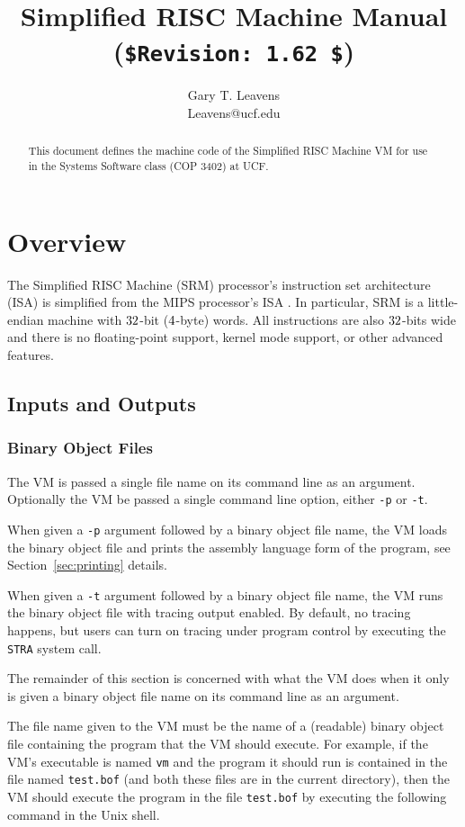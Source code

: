\documentclass[11pt,letterpaper]{article}
\title{Simplified RISC Machine Manual \\
       (\lstinline!$Revision: 1.62 $!)}
\author{Gary T. Leavens \\
        Leavens@ucf.edu}
\newcommand{\secref}[1]{Section~\ref{#1}}  %
\begin{document}
\maketitle
\begin{abstract}
This document defines the machine code of the Simplified RISC Machine VM for
use in the Systems Software class (COP 3402) at UCF.
\end{abstract}

\section{Overview}

The Simplified RISC Machine (SRM) processor's instruction set architecture
(ISA) is simplified from the MIPS processor's ISA \cite{Kane-Heinrich92}. 
In particular, SRM is a little-endian machine with $32$-bit ($4$-byte) words.
All instructions are also $32$-bits wide and there is no floating-point support, kernel mode support, or other advanced features.

\subsection{Inputs and Outputs}

\subsubsection{Binary Object Files}

The VM is passed a single file name on its command line as an
argument.
Optionally the VM be passed a single command line option, either
\texttt{-p} or \texttt{-t}.

When given a \texttt{-p} argument followed by a binary object file
name, the VM loads the binary object file and prints the assembly
language form of the program, see \secref{sec:printing} details.

When given a \texttt{-t} argument followed by a binary object file
name, the VM runs the binary object file with tracing output enabled.
By default, no tracing happens, but users can turn on tracing under
program control by executing the \texttt{STRA} system call.

The remainder of this section is concerned
with what the VM does when it only is given a binary object file name
on its command line as an argument.

The file name given to the VM must be the name of a (readable)
binary object file containing the program that the VM should execute.
For example, if the VM's executable is named \texttt{vm} and the program it
should run is contained in the file named \texttt{test.bof}
(and both these files are in the current directory), then the VM should
execute the program in the file \texttt{test.bof} by executing
the following command in the Unix shell.
\end{document}
